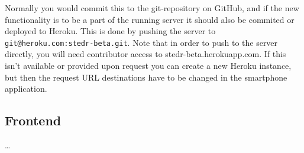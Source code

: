 Normally you would commit this to the git-repository on GitHub, and if the new functionality is to be a part of the running server it should also be commited or deployed to Heroku. This is done by pushing the server to \texttt{git@heroku.com:stedr-beta.git}. Note that in order to push to the server directly, you will need contributor access to stedr-beta.herokuapp.com. If this isn't available or provided upon request you can create a new Heroku instance, but then the request URL destinations have to be changed in the smartphone application.

\subsection{Frontend}

\dots


%
